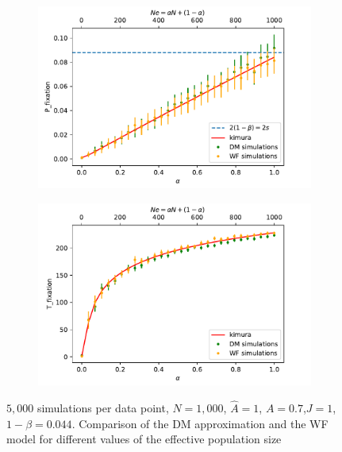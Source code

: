 \documentclass[11pt]{article}
\begin{document}
\begin{figure}[t]
  \begin{center}
  \begin{subfigure}[a]{0.49\linewidth}
    \includegraphics[width=\linewidth]{../figures/binary/fix_prob_var_alpha.pdf}
   \end{subfigure}
   \begin{subfigure}[a]{0.49\linewidth}
    \includegraphics[width=\linewidth]{../figures/binary/fix_time_var_alpha.pdf}
   \end{subfigure}
  \end{center}
  \caption{$5,000$ simulations per data point, $N=1,000$, $\hat{A}=1$, $A=0.7$,$J=1$,$1-\beta=0.044$.
  Comparison of the DM approximation and the WF model for different values of the effective population size}
  \label{fig:var_alpha}
\end{figure}
\end{document}
